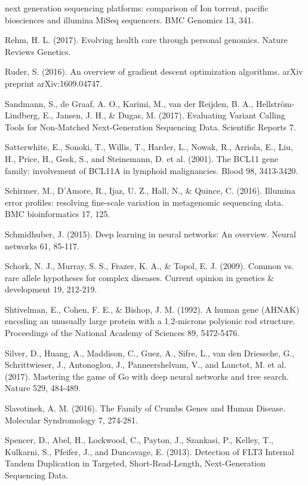 \documentclass{article}
\begin{document}
\begin{list}{}{%
\setlength{\topsep}{0pt}%
\setlength{\leftmargin}{0.5in}%
\setlength{\listparindent}{-0.5in}%
\setlength{\itemindent}{-0.5in}%
\setlength{\parsep}{\parskip}%
}
next generation sequencing platforms: comparison of Ion torrent, pacific biosciences and illumina MiSeq sequencers. BMC Genomics 13, 341.\\\item[] Rehm, H. L. (2017). Evolving health care through personal genomics. Nature Reviews Genetics.\\\item[] Ruder, S. (2016). An overview of gradient descent optimization algorithms. arXiv preprint arXiv:1609.04747.\\\item[] Sandmann, S., de Graaf, A. O., Karimi, M., van der Reijden, B. A., Hellström-Lindberg, E., Jansen, J. H., \& Dugas, M. (2017). Evaluating Variant Calling Tools for Non-Matched Next-Generation Sequencing Data. Scientific Reports 7.\\\item[] Satterwhite, E., Sonoki, T., Willis, T., Harder, L., Nowak, R., Arriola, E., Liu, H., Price, H., Gesk, S., and Steinemann, D. et al. (2001). The BCL11 gene family: involvement of BCL11A in lymphoid malignancies. Blood 98, 3413-3420.\\\item[] Schirmer, M., D’Amore, R., Ijaz, U. Z., Hall, N., \& Quince, C. (2016). Illumina error profiles: resolving fine-scale variation in metagenomic sequencing data. BMC bioinformatics 17, 125.\\\item[] Schmidhuber, J. (2015). Deep learning in neural networks: An overview. Neural networks 61, 85-117.\\\item[] Schork, N. J., Murray, S. S., Frazer, K. A., \& Topol, E. J. (2009). Common vs. rare allele hypotheses for complex diseases. Current opinion in genetics \& development 19, 212-219.\\\item[] Shtivelman, E., Cohen, F. E., \& Bishop, J. M. (1992). A human gene (AHNAK) encoding an unusually large protein with a 1.2-microns polyionic rod structure. Proceedings of the National Academy of Sciences 89, 5472-5476.\\\item[] Silver, D., Huang, A., Maddison, C., Guez, A., Sifre, L., van den Driessche, G., Schrittwieser, J., Antonoglou, J., Panneershelvam, V., and Lanctot, M. et al. (2017). Mastering the game of Go with deep neural networks and tree search. Nature 529, 484-489.\\\item[] Slavotinek, A. M. (2016). The Family of Crumbs Genes and Human Disease. Molecular Syndromology 7, 274-281.\\\item[] Spencer, D., Abel, H., Lockwood, C., Payton, J., Szankasi, P., Kelley, T., Kulkarni, S., Pfeifer, J., and Duncavage, E. (2013). Detection of FLT3 Internal Tandem Duplication in Targeted, Short-Read-Length, Next-Generation Sequencing Data. 
\end{list}
\end{document}
